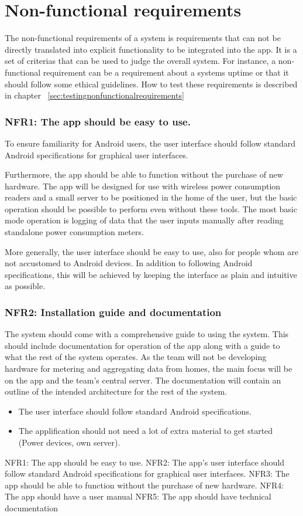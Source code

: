 \section{Non-functional requirements}
The non-functional requirements of a system is requirements that can not be directly translated into explicit functionality to be integrated into the app. It is a set of criterias that can be used to judge the overall system. For instance, a non-functional requirement can be a requirement about a systems uptime or that it should follow some ethical guidelines. How to test these requirements is described in chapter ~\ref{sec:testingnonfunctionalrequirements} 

\subsubsection{NFR1: The app should be easy to use.}
To ensure familiarity for Android users, the user interface should follow standard Android specifications for graphical user interfaces.
 
Furthermore, the app should be able to function without the purchase of new hardware. The app will be designed for use with wireless power consumption readers and a small server to be positioned in the home of the user, but the basic operation should be possible to perform even without these tools. The most basic mode operation is logging of data that 
the user inputs manually after reading standalone power consumption meters.
 
More generally, the user interface should be easy to use, also for people whom are not accustomed to Android devices. In 
addition to following Android specifications, this will be achieved by keeping the interface as plain and intuitive as possible.

\subsubsection{NFR2: Installation guide and documentation}
The system should come with a comprehensive guide to using the system. This should include documentation for operation of the
app along with a guide to what the rest of the system operates. As the team will not be developing hardware for metering and 
aggregating data from homes, the main focus will be on the app and the team's central server. The documentation will contain an outline 
of the intended architecture for the rest of the system.


\begin{itemize}
\item The user interface should follow standard Android specifications. 
\item The applification should not need a lot of extra material to get started (Power devices, own server).
\end{itemize}


NFR1: The app should be easy to use.
NFR2: The app’s user interface should follow standard Android specifications for graphical user interfaces. 
NFR3: The app should be able to function without the purchase of new hardware. 
NFR4: The app should have a user manual
NFR5: The app should have technical documentation
